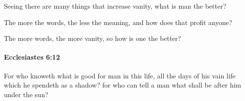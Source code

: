 			\begin{versebox}
					\item[BHS] 
					\item[LXX] 
					\item[ASV] Seeing there are many things that increase vanity, what is man the better?
					\item[NIV] The more the words, the less the meaning, and how does that profit anyone?
					\item[NRSV] The more words, the more vanity, so how is one the better?
			\end{versebox}

		\paragraph{Ecclesiastes 6:12} %
			\label{ECCLESIASTES-6-12}

			For who knoweth what is good for man in this life, all the days of his vain life which he spendeth as a shadow? for who can tell a man what shall be after him under the sun?

